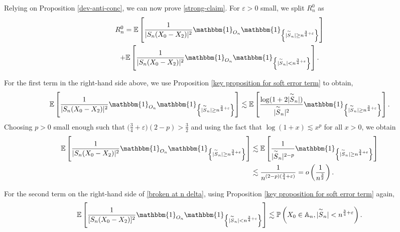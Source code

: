 \documentclass[9pt,a4paper,reqno]{amsart}
\newcommand{\tildea}[1]{\overset{\sim}{#1}}
\theoremstyle{mine}
\theoremstyle{definition}
\theoremstyle{remark}
\renewcommand\epsilon{\varepsilon}
\newcommand{\mb}{\mathbb}
\begin{document}
    Relying on Proposition \ref{dev-anti-conc}, we can now prove \eqref{strong-claim}. For $\epsilon>0$ small, we split $R_n^0$ as 
    \begin{multline}\label{broken at n delta}
     R_n^0= \mathbb{E}\left[ \frac{1}{|S_n(X_0-X_2)|^2} \mathbbm{1}_{O_n} \mathbbm{1}_{\left\{|\tildea{S}_n| \geq n^{\frac{3}{4}+ \epsilon} \right\} }\right]\\ + \mathbb{E}\left[ \frac{1}{|S_n(X_0-X_2)|^2} \mathbbm{1}_{O_n }\mathbbm{1}_{\left\{|\tildea{S}_n| <n^{\frac{3}{4}+ \epsilon}\right \}}\right].
\end{multline}


For the first term in the right-hand side above, we use Proposition \ref{key proposition for soft error term} to obtain,
\begin{align*}
    \mathbb{E}\left[ \frac{1}{|S_n(X_0-X_2)|^2} \mathbbm{1}_{O_n} \mathbbm{1}_{\left\{|\tildea{S}_n| \geq n^{\frac{3}{4}+ \epsilon} \right\} }\right] \lesssim \mathbb{E}\left[ \frac{\log(1+2|\tildea{S}_n|)}{|\tildea{S}_n|^2} \mathbbm{1}_{\left\{|\tildea{S}_n| \geq n^{\frac{3}{4}+ \epsilon} \right\} }\right].
\end{align*}
Choosing $p>0$ small enough such that $\big(\frac{3}{4}+ \epsilon\big)(2-p) > \frac{3}{2}$ and using the fact that $\log(1+x) \lesssim x^p$ for all $x>0$, we obtain
\begin{align*}
    \mathbb{E}\left[ \frac{1}{|S_n(X_0-X_2)|^2} \mathbbm{1}_{O_n} \mathbbm{1}_{\left\{|\tildea{S}_n| \geq n^{\frac{3}{4}+ \epsilon} \right\} }\right] &\lesssim \mathbb{E}\left[ \frac{1}{|\tildea{S}_n|^{2-p}} \mathbbm{1}_{\left\{|\tildea{S}_n| \geq n^{\frac{3}{4}+ \epsilon} \right\} }\right]\\
    &\lesssim \frac{1}{n^{(2-p)(\frac{3}{4} + \epsilon)}} = o\left(\frac{1}{n^{\frac{3}{2}}}\right).
\end{align*}

For the second term on the right-hand side of \eqref{broken at n delta}, using Proposition \ref{key proposition for soft error term} again, 
\begin{equation}\label{first-term-of-split}
     \mathbb{E}\left[ \frac{1}{[S_n(X_0-X_2)]^2} \mathbbm{1}_{O_n } \mathbbm{1}_{\left\{|\tildea{S}_n| < n^{\frac{3}{4}+ \epsilon} \right\} }\right] \lesssim \mathbb{P} \left(X_0 \in \mb{A}_n,| \tildea{S}_n| < n^{\frac{3}{4}+ \epsilon} \right). 
\end{equation}
\end{document}
